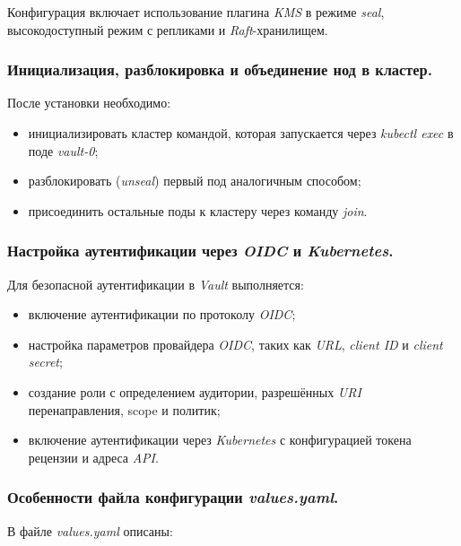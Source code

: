 Конфигурация включает использование плагина \textit{KMS} в режиме \textit{seal}, высокодоступный режим с репликами и \textit{Raft}-хранилищем.

\subsubsection{Инициализация, разблокировка и объединение нод в кластер.} После установки необходимо:

\begin{itemize}
    \item инициализировать кластер командой, которая запускается через \textit{kubectl exec} в поде \textit{vault-0};
    \item разблокировать (\textit{unseal}) первый под аналогичным способом;
    \item присоединить остальные поды к кластеру через команду \textit{join}.
\end{itemize}

\subsubsection{Настройка аутентификации через \textit{OIDC} и \textit{Kubernetes}.} Для безопасной аутентификации в \textit{Vault} выполняется:

\begin{itemize}
    \item включение аутентификации по протоколу \textit{OIDC};
    \item настройка параметров провайдера \textit{OIDC}, таких как \textit{URL}, \textit{client ID} и \textit{client secret};
    \item создание роли с определением аудитории, разрешённых \textit{URI} перенаправления, scope и политик;
    \item включение аутентификации через \textit{Kubernetes} с конфигурацией токена рецензии и адреса \textit{API}.
\end{itemize}

\subsubsection{Особенности файла конфигурации \textit{values.yaml}.} В файле \textit{values.yaml} описаны:

